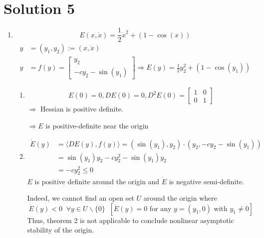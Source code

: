 \documentclass[twoside,10pt,a4paper]{article}
\begin{document}
\section*{Solution 5}
\begin{enumerate}[label=(\alph*)]
\item 
\begin{equation*}
	E(x,\dot{x}) = \frac{1}{2}\dot{x}^2 + (1 - \cos(x))
\end{equation*}
\begin{align*}
	y &= (y_1,y_2) := (x, \dot{x}) \\
	y &= f(y) = \begin{bmatrix}
		y_2 \\
		-cy_2 - \sin(y_1)
	\end{bmatrix} \Longrightarrow
	E(y) = \frac{1}{2}y_2^2 + (1 - \cos(y_1))
\end{align*}

\begin{enumerate}[label=(\roman*)]
\item 
\begin{equation*}
	E(0) = 0, DE(0) = 0, D^2E(0) = \begin{bmatrix}
	1 & 0 \\ 0 & 1
	\end{bmatrix}
\end{equation*}
$\Longrightarrow$ Hessian is positive definite.

$\Longrightarrow E$ is positive-definite near the origin

\item 
\begin{align*}
	\dot{E}(y) &= \langle DE(y),f(y) \rangle = (\sin(y_1),y_2) \cdot (y_2, -cy_2 - \sin(y_1)) \\
	&= \sin(y_1)y_2 - cy_2^2 -\sin(y_1)y_2 \\
	&= -cy_2^2 \leq 0
\end{align*}
$E$ is positive definite around the origin and $\dot{E}$ is negative semi-definite.

Indeed, we cannot find an open set $U$ around the origin where
\begin{equation*}
	\dot{E}(y)<0 \;\; \forall y \in U\backslash \{0\} \;\; [\dot{E}(y)=0 \text{ for any } y = (y_1,0) \text{ with } y_1 \neq 0]
\end{equation*}
Thus, theorem 2 is not applicable to conclude nonlinear asymptotic stability of the origin.

\end{enumerate}



\end{enumerate}
\end{document}
